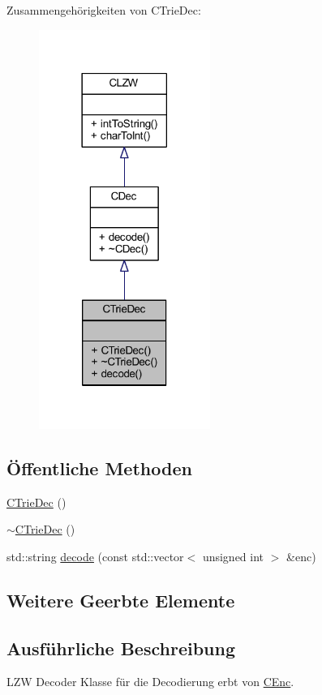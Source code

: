 Zusammengehörigkeiten von C\+Trie\+Dec\+:
\nopagebreak
\begin{figure}[H]
\begin{center}
\leavevmode
\includegraphics[width=158pt]{class_c_trie_dec__coll__graph}
\end{center}
\end{figure}
\subsection*{Öffentliche Methoden}
\begin{DoxyCompactItemize}
\item 
\hyperlink{class_c_trie_dec_a64323697e83419686801b04c5b12ac37}{C\+Trie\+Dec} ()
\item 
\hyperlink{class_c_trie_dec_a2e3dee1b9fae4e8fd82a7ba6247bb564}{$\sim$\+C\+Trie\+Dec} ()
\item 
std\+::string \hyperlink{class_c_trie_dec_a190f82222a2f7881b940066c54b00d38}{decode} (const std\+::vector$<$ unsigned int $>$ \&enc)
\end{DoxyCompactItemize}
\subsection*{Weitere Geerbte Elemente}


\subsection{Ausführliche Beschreibung}
L\+ZW Decoder Klasse für die Decodierung erbt von \hyperlink{class_c_enc}{C\+Enc}. 

